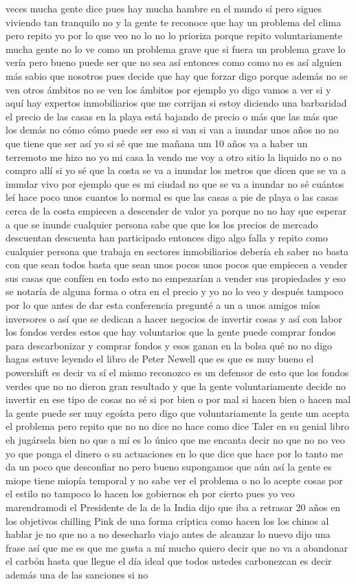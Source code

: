 veces mucha gente dice pues hay mucha hambre en el mundo sí pero sigues viviendo tan tranquilo no y la gente te reconoce que hay un problema del clima pero repito yo por lo que veo no lo no lo prioriza porque repito voluntariamente mucha gente no lo ve como un problema grave que si fuera un problema grave lo vería pero bueno puede ser que no sea así entonces como como no es así alguien más sabio que nosotros pues decide que hay que forzar digo porque además no se ven otros ámbitos no se ven los ámbitos por ejemplo yo digo vamos a ver si y aquí hay expertos inmobiliarios que me corrijan si estoy diciendo una barbaridad el precio de las casas en la playa está bajando de precio o más que las más que los demás no cómo cómo puede ser eso si van si van a inundar unos años no no que tiene que ser así yo si sé que me mañana um 10 años va a haber un terremoto me hizo no yo mi casa la vendo me voy a otro sitio la liquido no o no compro allí si yo sé que la costa se va a inundar los metros que dicen que se va a inundar vivo por ejemplo que es mi ciudad no que se va a inundar no sé cuántos leí hace poco unos cuantos lo normal es que las casas a pie de playa o las casas cerca de la costa empiecen a descender de valor ya porque no no hay que esperar a que se inunde cualquier persona sabe que que los los precios de mercado descuentan descuenta han participado entonces digo algo falla y repito como cualquier persona que trabaja en sectores inmobiliarios debería eh saber no basta con que sean todos basta que sean unos pocos unos pocos que empiecen a vender sus casas que confíen en todo esto no empezarían a vender sus propiedades y eso se notaría de alguna forma o otra en el precio y yo no lo veo y después tampoco por lo que antes de dar esta conferencia pregunté a un a unos amigos míos inversores o así que se dedican a hacer negocios de invertir cosas y así con labor los fondos verdes estos que hay voluntarios que la gente puede comprar fondos para descarbonizar y comprar fondos y esos ganan en la bolsa qué no no digo hagas estuve leyendo el libro de Peter Newell que es que es muy bueno el powershift es decir va sí el mismo reconozco es un defensor de esto que los fondos verdes que no no dieron gran resultado y que la gente voluntariamente decide no invertir en ese tipo de cosas no sé si por bien o por mal si hacen bien o hacen mal la gente puede ser muy egoísta pero digo que voluntariamente la gente um acepta el problema pero repito que no no dice no hace como dice Taler en su genial libro eh jugársela bien no que a mí es lo único que me encanta decir no que no no veo yo que ponga el dinero o su actuaciones en lo que dice que hace por lo tanto me da un poco que desconfiar no pero bueno supongamos que aún así la gente es miope tiene miopía temporal y no sabe ver el problema o no lo acepte cosas por el estilo no tampoco lo hacen los gobiernos eh por cierto pues yo veo marendramodi el Presidente de la de la India dijo que iba a retrasar 20 años en los objetivos chilling Pink de una forma críptica como hacen los los chinos al hablar je no que no a no desecharlo viajo antes de alcanzar lo nuevo dijo una frase así que me es que me gusta a mí mucho quiero decir que no va a abandonar el carbón hasta que llegue el día ideal que todos ustedes carbonezcan es decir además una de las sanciones si no 